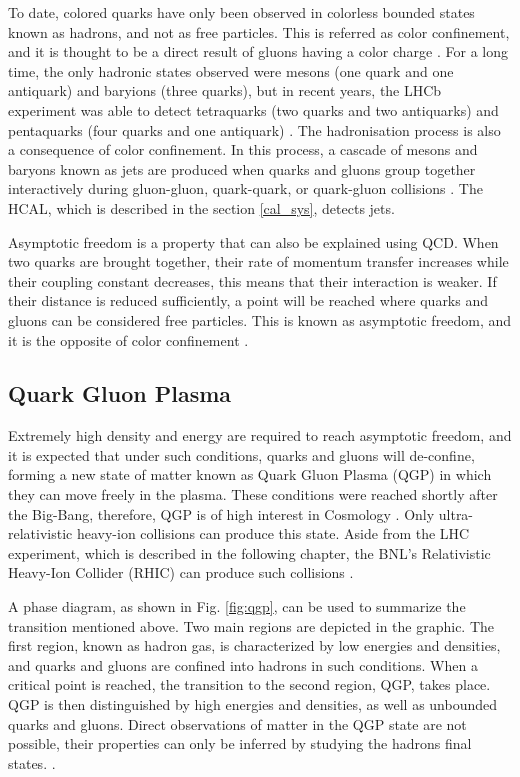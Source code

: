 To date, colored quarks have only been observed in colorless bounded states known as hadrons, and not as free particles. This is referred as color confinement, and it is thought to be a direct result of gluons having a color charge \cite{di2020measurement, thomson2013modern}. For a long time, the only hadronic states observed were mesons (one quark and one antiquark) and baryions (three quarks), but in recent years, the LHCb experiment was able to detect  tetraquarks (two quarks and two antiquarks) \cite{aaij2021study} and pentaquarks (four quarks and one antiquark) \cite{aaij2015observation}. The hadronisation process is also a consequence of color confinement.  In this process, a cascade of mesons and baryons known as jets are produced when quarks and gluons group together interactively during gluon-gluon, quark-quark, or quark-gluon collisions \cite{di2020measurement, baron2018desarrollo}.  The HCAL, which is described in the section \ref{cal_sys}, detects jets.

Asymptotic freedom is a property that can also be explained using QCD. When two quarks are brought together, their rate of momentum transfer increases while their coupling constant decreases, this means that their interaction is weaker. If their distance is reduced sufficiently, a point will be reached where quarks and gluons can be considered free particles. This is known as asymptotic freedom, and it is the opposite of color confinement \cite{danilov2020measurement, di2020measurement, sanchez2020search}. 

\subsection{Quark Gluon Plasma}
Extremely high density and energy are required to reach asymptotic freedom, and it is expected that under such conditions, quarks and gluons will de-confine, forming a new state of matter known as Quark Gluon Plasma (QGP) in which they can move freely in the plasma. These conditions were reached shortly after the Big-Bang, therefore, QGP is of high interest in Cosmology \cite{aziz2021z}. Only ultra-relativistic heavy-ion collisions can produce this state. Aside from the LHC experiment, which is described in the following chapter, the BNL's Relativistic Heavy-Ion Collider (RHIC) can produce such collisions \cite{villatorodetection}. 

A phase diagram, as shown in Fig. \ref{fig:qgp}, can be used to summarize the transition mentioned above. Two main regions are depicted in the graphic.  The first region, known as hadron gas, is characterized by low energies and densities, and quarks and gluons are confined into hadrons in such conditions. When a critical point is reached, the transition to the second region, QGP, takes place. QGP is then distinguished by high energies and densities, as well as unbounded quarks and gluons. Direct observations of matter in the QGP state are not possible, their properties can only be inferred by studying the hadrons final states. \cite{villatorodetection, parkkila2021quantifying}.


